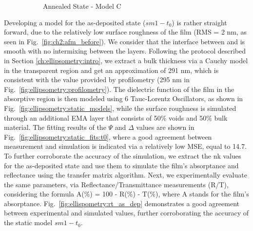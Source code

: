 \begin{figure}[t]
\begin{subfigure}[t]{0.45\textwidth}
        \caption{Annealed State - Model C}
        \label{fig:ellipsometry:static_fits:t23_fixed_thick_x_void}
    \end{subfigure}
    \caption{}
    \label{fig:ellipsometry:static_fits}
\end{figure}

Developing a model for the as-deposited state ($sm1-t_0$) is rather straight forward, due to the relatively low surface roughness of the film (RMS = 2 nm, as seen in Fig.~\ref{fig:ch2:afm_before}). We consider that the interface between  and  is smooth with no intermixing between the layers. Following the protocol described in Section \ref{ch:ellipsometry:intro}, we extract a bulk thickness via a Cauchy model in the transparent region and get an approximation of 291 nm, which is consistent with the value provided by profilometry (295 nm in Fig.~\ref{fig:ellipsometry:profilometry}). The dielectric function of the film in the absorptive region is then modeled using 6 Tauc-Lorentz Oscillators, as shown in Fig.~\ref{fig:ellipsometry:static_models}, while the surface roughness is simulated through an additional EMA layer that consists of 50\% voids and 50\% bulk material. The fitting results of the $\Psi$ and $\Delta$ values are shown in Fig.~\ref{fig:ellipsometry:static_fits:t0}, where a good agreement between measurement and simulation is indicated via a relatively low MSE, equal to 14.7. To further corroborate the accuracy of the simulation, we extract the nk values for the as-deposited state and use them to simulate the film's absorptance and reflectance using the transfer matrix algorithm. Next, we experimentally evaluate the same parameters, via Reflectance/Transmittance measurements (R/T), considering the formula A(\%) = 100 - R(\%) - T(\%), where A stands for the film's absorptance. Fig.~\ref{fig:ellispometry:rt_as_dep} demonstrates a good agreement between experimental and simulated values, further corroborating the accuracy of the static model $sm1-t_0$.


